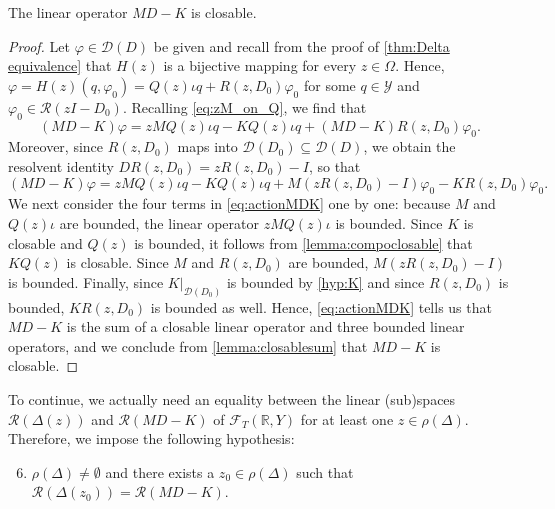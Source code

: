 \documentclass[english]{myarticle}
\begin{document}
\begin{sloppypar}
\begin{lemma} \label{lemma:MDKclosable}
The linear operator $MD-K$ is closable.    
\end{lemma}
\begin{proof}
Let $\varphi \in \mathcal{D}(D)$ be given and recall from the proof of \cref{thm:Delta equivalence} that $H(z)$ is a bijective mapping for every $z \in \Omega$. Hence, $\varphi = H(z)(q,\varphi_0) = Q(z)\iota q + R(z,D_0)\varphi_0$ for some $q \in \mathcal{Y}$ and $\varphi_0 \in \mathcal{R}(zI-D_0)$. Recalling \eqref{eq:zM_on_Q}, we find that
\begin{equation*} 
    (MD-K)\varphi = zMQ(z)\iota q - KQ(z)\iota q + (MD-K)R(z,D_0)\varphi_0.
\end{equation*}
Moreover, since $R(z,D_0)$ maps into $\mathcal{D}(D_0) \subseteq \mathcal{D}(D)$, we obtain the resolvent identity $D R(z, D_0) = zR(z, D_0)-I$, so that
\begin{equation} \label{eq:actionMDK}
     (MD-K)\varphi = zMQ(z)\iota q - KQ(z)\iota q + M(zR(z, D_0) - I) \varphi_0 - KR(z, D_0) \varphi_0. 
\end{equation}
We next consider the four terms in \eqref{eq:actionMDK} one by one:
because $M$ and $Q(z) \iota$ are bounded, the linear operator $zMQ(z)\iota$ is bounded.  Since $K$ is closable and $Q(z)$ is bounded, it follows from \cref{lemma:compoclosable} that $KQ(z)$ is closable. Since $M$ and $R(z, D_0)$ are bounded, $M(zR(z, D_0) - I)$ is bounded. Finally, since $K|_{\mathcal{D}(D_0)}$ is bounded by \ref{hyp:K} and since $R(z, D_0)$ is bounded, $KR(z, D_0)$ is bounded as well. Hence, \eqref{eq:actionMDK} tells us that $MD-K$ is the sum of a closable linear operator and three bounded linear operators, and we conclude from \cref{lemma:closablesum} that $MD-K$ is closable.    
\end{proof}

To continue, we actually need an equality between the linear (sub)spaces $\mathcal{R}(\Delta(z))$ and $ \mathcal{R}(MD - K)$ of $\mathcal{F}_T(\mathbb{R},Y)$ for at least one $z \in \rho(\Delta)$. Therefore, we impose the following hypothesis:
\begin{enumerate}[label=({H}{{\arabic*}})]
\setcounter{enumi}{5}
\item \label{hyp:rangeequal} 
$\rho(\Delta) \neq \emptyset$ and there exists a $z_0 \in \rho(\Delta)$ such that $\mathcal{R}(\Delta(z_0)) = \mathcal{R}(MD - K)$.
\end{enumerate}


\end{sloppypar}
\end{document}
